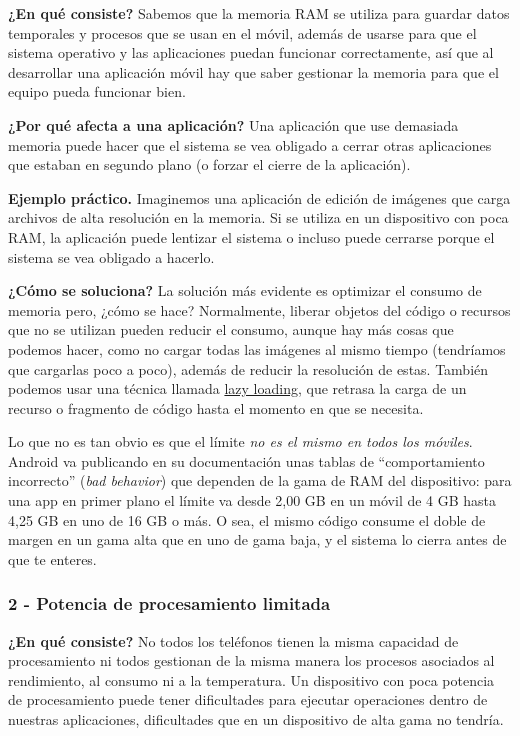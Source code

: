\documentclass[11pt,a4paper]{article}
\newcommand{\campo}[1]{\textbf{\color{navy}#1}}
\begin{document}
	\campo{¿En qué consiste?}
	Sabemos que la memoria RAM se utiliza para guardar datos temporales y procesos que se usan en el móvil, además de usarse para que el sistema operativo y las aplicaciones puedan funcionar correctamente, así que al desarrollar una aplicación móvil hay que saber gestionar la memoria para que el equipo pueda funcionar bien.
	
	\campo{¿Por qué afecta a una aplicación?}
	Una aplicación que use demasiada memoria puede hacer que el sistema se vea obligado a cerrar otras aplicaciones que estaban en segundo plano (o forzar el cierre de la aplicación).
	
	\campo{Ejemplo práctico.}
	Imaginemos una aplicación de edición de imágenes que carga archivos de alta resolución en la memoria. Si se utiliza en un dispositivo con poca RAM, la aplicación puede lentizar el sistema o incluso puede cerrarse porque el sistema se vea obligado a hacerlo.
	
	\campo{¿Cómo se soluciona?}
	La solución más evidente es optimizar el consumo de memoria pero, ¿cómo se hace? Normalmente, liberar objetos del código o recursos que no se utilizan pueden reducir el consumo, aunque hay más cosas que podemos hacer, como no cargar todas las imágenes al mismo tiempo (tendríamos que cargarlas poco a poco), además de reducir la resolución de estas. También podemos usar una técnica llamada \href{https://es.wikipedia.org/wiki/Lazy_loading}{lazy loading}, que retrasa la carga de un recurso o fragmento de código hasta el momento en que se necesita.
	
	Lo que no es tan obvio es que el límite \emph{no es el mismo en todos los móviles}. Android va publicando en su documentación unas tablas de \enquote{comportamiento incorrecto} (\emph{bad behavior}) que dependen de la gama de RAM del dispositivo: para una app en primer plano el límite va desde 2,00 GB en un móvil de 4 GB hasta 4,25 GB en uno de 16 GB o más. O sea, el mismo código consume el doble de margen en un gama alta que en uno de gama baja, y el sistema lo cierra antes de que te enteres.
	
	\subsubsection*{2 - Potencia de procesamiento limitada}
	
	\campo{¿En qué consiste?}
	No todos los teléfonos tienen la misma capacidad de procesamiento ni todos gestionan de la misma manera los procesos asociados al rendimiento, al consumo ni a la temperatura. Un dispositivo con poca potencia de procesamiento puede tener dificultades para ejecutar operaciones dentro de nuestras aplicaciones, dificultades que en un dispositivo de alta gama no tendría.
	
\end{document}
